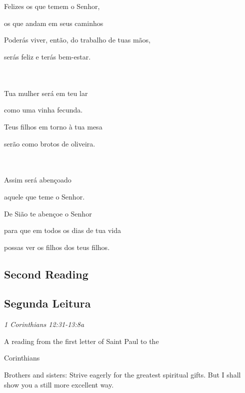 \documentclass[10pt,a5]{article}
\newcommand \subsect[2] {\subsection*{#1} \switchcolumn \subsection*{#2} \switchcolumn*}
\begin{document}
\begin{paracol}{2}
\switchcolumn

\\
\\

Felizes os que temem o Senhor,  

\hspace*{2em}os que andam em seus caminhos

Poderás viver, então, do trabalho de tuas mãos,

\hspace*{2em}serás feliz e terás bem-estar.

\\
\\

Tua mulher será em teu lar

\hspace*{2em}como uma vinha fecunda.

Teus filhos em torno à tua mesa 

\hspace*{2em}serão como brotos de oliveira.

\\
\\

Assim será abençoado 

\hspace*{2em}aquele que teme o Senhor.

De Sião te abençoe o Senhor 

\hspace*{2em}para que em todos os dias de tua vida

\hspace*{2em}possas ver os filhos dos teus filhos.


 \switchcolumn*

 \subsect{Second Reading}{Segunda Leitura}

 \textit{1 Corinthians 12:31-13:8a}

\hspace{2em} A reading from the first letter of Saint Paul to the 

\hspace{2em} Corinthians

Brothers and sisters: Strive eagerly for the greatest spiritual gifts.
But I shall show you a still more excellent way.  


\end{paracol}
\end{document}
